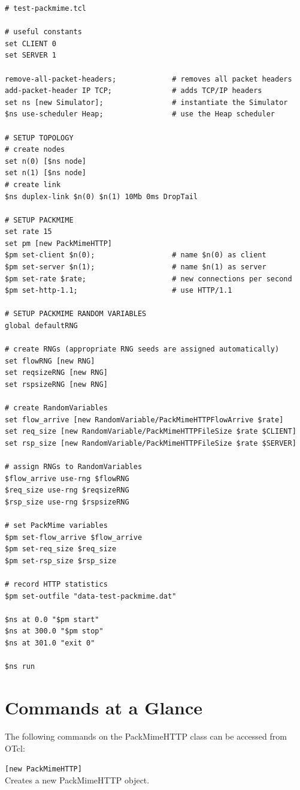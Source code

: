 \begin{verbatim}
# test-packmime.tcl

# useful constants
set CLIENT 0
set SERVER 1

remove-all-packet-headers;             # removes all packet headers
add-packet-header IP TCP;              # adds TCP/IP headers
set ns [new Simulator];                # instantiate the Simulator
$ns use-scheduler Heap;                # use the Heap scheduler

# SETUP TOPOLOGY
# create nodes
set n(0) [$ns node]
set n(1) [$ns node]
# create link
$ns duplex-link $n(0) $n(1) 10Mb 0ms DropTail

# SETUP PACKMIME
set rate 15
set pm [new PackMimeHTTP]
$pm set-client $n(0);                  # name $n(0) as client
$pm set-server $n(1);                  # name $n(1) as server
$pm set-rate $rate;                    # new connections per second
$pm set-http-1.1;                      # use HTTP/1.1

# SETUP PACKMIME RANDOM VARIABLES
global defaultRNG

# create RNGs (appropriate RNG seeds are assigned automatically)
set flowRNG [new RNG]
set reqsizeRNG [new RNG]
set rspsizeRNG [new RNG]

# create RandomVariables
set flow_arrive [new RandomVariable/PackMimeHTTPFlowArrive $rate]
set req_size [new RandomVariable/PackMimeHTTPFileSize $rate $CLIENT]
set rsp_size [new RandomVariable/PackMimeHTTPFileSize $rate $SERVER]

# assign RNGs to RandomVariables
$flow_arrive use-rng $flowRNG
$req_size use-rng $reqsizeRNG
$rsp_size use-rng $rspsizeRNG

# set PackMime variables
$pm set-flow_arrive $flow_arrive
$pm set-req_size $req_size
$pm set-rsp_size $rsp_size

# record HTTP statistics
$pm set-outfile "data-test-packmime.dat"

$ns at 0.0 "$pm start"
$ns at 300.0 "$pm stop"
$ns at 301.0 "exit 0"

$ns run
\end{verbatim}

\section{Commands at a Glance}
The following commands on the PackMimeHTTP class can be accessed from OTcl:

{\tt [new PackMimeHTTP]}\\
Creates a new PackMimeHTTP object.

